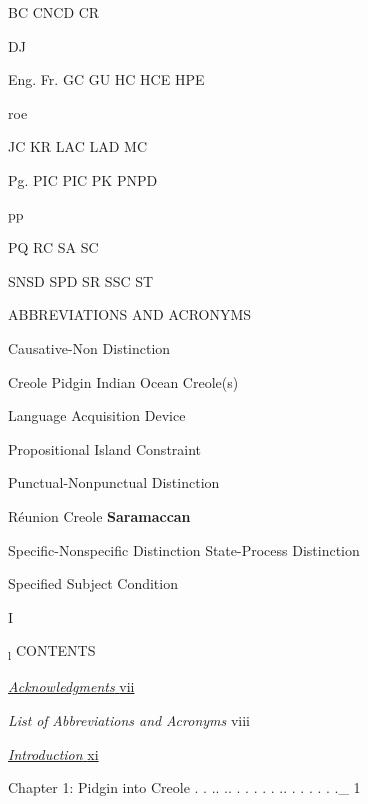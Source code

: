 
BC CNCD CR

DJ

Eng. Fr. GC GU HC HCE HPE

roe

JC KR LAC LAD MC

Pg. PIC PIC PK PNPD

pp

PQ RC SA SC

SNSD SPD SR SSC ST

ABBREVIATIONS AND ACRONYMS


Causative-Non Distinction 

  

 


 Creole   Pidgin  Indian Ocean Creole(s) 


 Language Acquisition Device 


Propositional Island Constraint 


Punctual-Nonpunctual Distinction 

 Réunion Creole \textbf{Saramaccan} 

Specific-Nonspecific Distinction State-Process Distinction


Specified Subject Condition 

I

\textsubscript{l }CONTENTS 

\hyperlink{TOC250001}{\textit{Acknowledgments}}\hyperlink{TOC250001}{ }\hyperlink{TOC250001}{vii}

\textit{List}\textit{ }\textit{of}\textit{ }\textit{Abbreviations and}\textit{ }\textit{Acronyms} viii

\hyperlink{TOC250000}{\textit{Introduction}}\hyperlink{TOC250000}{ }\hyperlink{TOC250000}{xi}

Chapter 1: Pidgin into Creole . . .. .. . . . . . .. . . . . . .\_ 1

